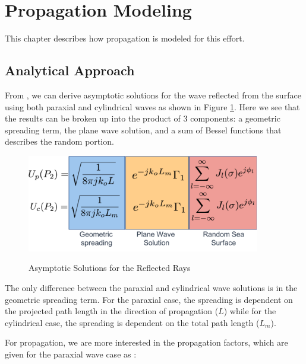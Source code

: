 \renewcommand{\baselinestretch}{2} \small\normalsize
\section{Propagation Modeling}
This chapter describes how propagation is modeled for this effort.

\subsection{Analytical Approach}
From \cite{frazier_green}, we can derive asymptotic solutions for the wave reflected from the surface using both paraxial and cylindrical waves as shown in Figure \ref{prop_fig:0}. Here we see that the results can be broken up into the product of 3 components: a geometric spreading term, the plane wave solution, and a sum of Bessel functions that describes the random portion. 

\begin{figure}[H]
  \begin{center}
\includegraphics[width=4in]{../media/multistatic/analytical_solutions.png}
  \end{center}
  \renewcommand{\baselinestretch}{1} \small\normalsize
  \begin{quote}
    \caption[Asymptotic Solutions for the Reflected Rays]{Asymptotic Solutions for the Reflected Rays\label{prop_fig:0}}
  \end{quote}
\end{figure}
\renewcommand{\baselinestretch}{2} \small\normalsize

The only difference between the paraxial and cylindrical wave solutions is in the geometric spreading term. For the paraxial case, the spreading is dependent on the projected path length in the direction of propagation ($L$) while for the cylindrical case, the spreading is dependent on the total path length ($L_m$). 

For propagation, we are more interested in the propagation factors, which are given for the paraxial wave case as \cite{frazier_green}:

